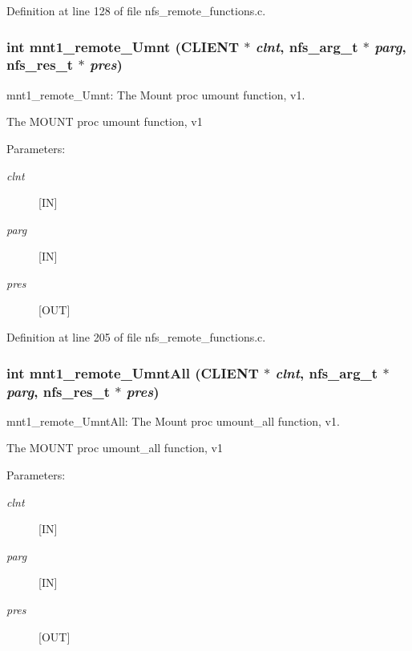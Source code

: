 Definition at line 128 of file nfs\_\-remote\_\-functions.c.
\subsubsection[{mnt1\_\-remote\_\-Umnt}]{\setlength{\rightskip}{0pt plus 5cm}int mnt1\_\-remote\_\-Umnt (CLIENT $\ast$ {\em clnt}, \/  nfs\_\-arg\_\-t $\ast$ {\em parg}, \/  nfs\_\-res\_\-t $\ast$ {\em pres})}\label{group__MNTprocs_g12436609c27ab5881d690c41981e7bb1}


mnt1\_\-remote\_\-Umnt: The Mount proc umount function, v1.

The MOUNT proc umount function, v1

\begin{Desc}
\item[Parameters:]
\begin{description}
\item[{\em clnt}][IN] \item[{\em parg}][IN] \item[{\em pres}][OUT] \end{description}
\end{Desc}


Definition at line 205 of file nfs\_\-remote\_\-functions.c.
\subsubsection[{mnt1\_\-remote\_\-UmntAll}]{\setlength{\rightskip}{0pt plus 5cm}int mnt1\_\-remote\_\-UmntAll (CLIENT $\ast$ {\em clnt}, \/  nfs\_\-arg\_\-t $\ast$ {\em parg}, \/  nfs\_\-res\_\-t $\ast$ {\em pres})}\label{group__MNTprocs_g210e44facdf641082e0d0c030751d1ad}


mnt1\_\-remote\_\-UmntAll: The Mount proc umount\_\-all function, v1.

The MOUNT proc umount\_\-all function, v1

\begin{Desc}
\item[Parameters:]
\begin{description}
\item[{\em clnt}][IN] \item[{\em parg}][IN] \item[{\em pres}][OUT] \end{description}
\end{Desc}


